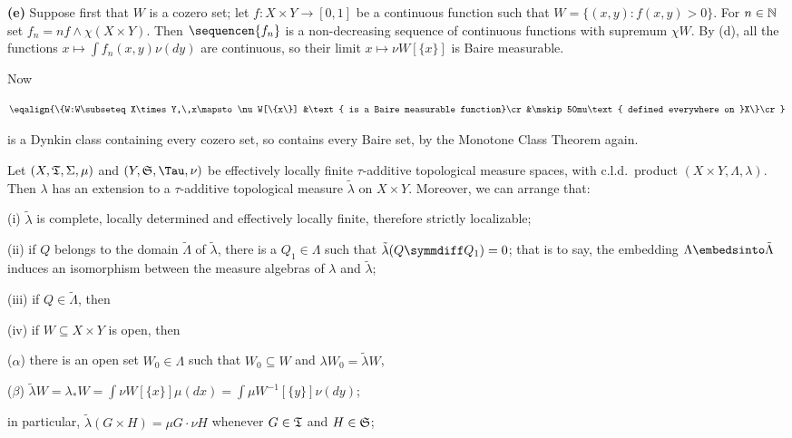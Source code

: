 {\medskip

{\bf (e)} Suppose first that $W$ is a cozero set;  let
$f:X\times Y\to[0,1]$ be a continuous function such that
$W=\{(x,y):f(x,y)>0\}$.   For $n\in\Bbb N$ set
$f_n=nf\wedge\chi(X\times Y)$.   Then $\sequencen{f_n}$ is a
non-decreasing sequence of continuous functions with supremum $\chi W$.
By (d), all the functions $x\mapsto\int f_n(x,y)\nu(dy)$ are continuous,
so their limit $x\mapsto\nu W[\{x\}]$ is Baire measurable.

Now

$$\eqalign{\{W:W\subseteq X\times Y,\,x\mapsto\nu W[\{x\}]
&\text{ is a Baire measurable function}\cr
&\mskip50mu\text{ defined everywhere on }X\}\cr}$$

\noindent is a Dynkin class containing every cozero set, so contains
every Baire set, by the Monotone Class Theorem again.
}%

 Let
$(X,\frak T,\Sigma,\mu)$ and
$(Y,\frak S,\Tau,\nu)$ be effectively locally finite $\tau$-additive
topological
measure spaces, with c.l.d.\ product $(X\times Y,\Lambda,\lambda)$.
Then $\lambda$ has an extension to a $\tau$-additive topological measure
$\tilde\lambda$ on $X\times Y$.   Moreover, we can arrange that:

(i) $\tilde\lambda$ is complete, locally determined and effectively
locally finite, therefore strictly localizable;

(ii) if $Q$ belongs to the domain $\tilde\Lambda$ of $\tilde\lambda$,
there is a $Q_1\in\Lambda$ such that $\tilde\lambda(Q\symmdiff Q_1)=0$;
that is to say, the embedding $\Lambda\embedsinto\tilde\Lambda$ induces an
isomorphism between the measure algebras of $\lambda$ and
$\tilde\lambda$;

(iii) if $Q\in\tilde\Lambda$, then


(iv) if $W\subseteq X\times Y$ is open, then 

\quad($\alpha$) there is an open set
$W_0\in\Lambda$ such that $W_0\subseteq W$ and
$\lambda W_0=\tilde\lambda W$, 

\quad($\beta$) $\tilde\lambda W=\lambda_*W
=\int\nu W[\{x\}]\mu(dx)=\int\mu W^{-1}[\{y\}]\nu(dy)$;

\noindent in particular, $\tilde\lambda(G\times H)=\mu G\cdot\nu H$ 
whenever $G\in\frak T$ and $H\in\frak S$;

